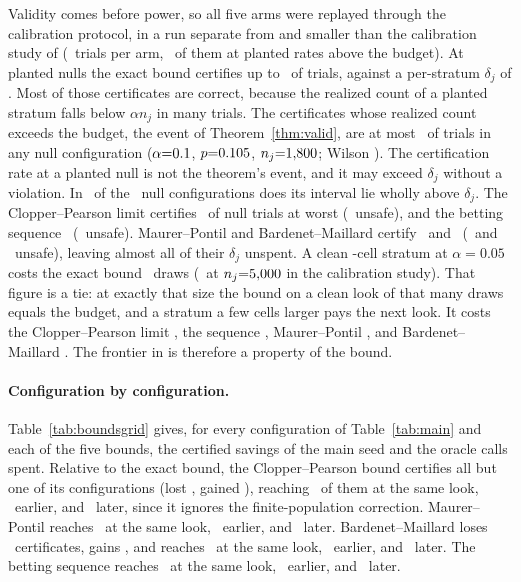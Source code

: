 Validity comes before power, so all five arms were replayed through
the calibration protocol, in a run separate from and smaller than the
calibration study of  (\boundCalTrials\ trials
per arm, \boundNullTrials\ of them at planted rates above the budget). At
planted nulls the exact bound certifies up to \boundExactNullWorst\ of
trials, against a per-stratum $\delta_j$ of \boundNullDeltaS. Most
of those certificates are correct, because the realized count of
a planted stratum falls below $\alpha n_j$ in many trials. The
certificates whose realized count exceeds the budget, the event of
Theorem~\ref{thm:valid}, are at most \boundExactNullUnsafe\ of trials
in any null configuration ($\alpha{=}0.1$,
$p{=}0.105$, $n_j{=}1{,}800$; Wilson
\boundExactNullUnsafeCi). The certification rate at a planted null is
not the theorem's event, and it may exceed $\delta_j$ without a
violation. In \boundExactNullsOver\ of the \boundNullConfigs\ null
configurations does its interval lie wholly above $\delta_j$. The Clopper--Pearson limit certifies \boundCpNullWorst\ of
null trials at worst (\boundCpNullUnsafe\ unsafe), and the betting
sequence \boundBetNullWorst\ (\boundBetNullUnsafe\ unsafe).
Maurer--Pontil and Bardenet--Maillard certify
\boundEbNullWorst\ and \boundWorNullWorst\ (\boundEbNullUnsafe\ and
\boundWorNullUnsafe\ unsafe), leaving almost all of their $\delta_j$
unspent. A clean \boundCleanStratum-cell stratum at
$\alpha{=}0.05$ costs the exact bound \boundExactCleanSample\ draws
(\minZeroFlipRealizedLarge\ at $n_j{=}5{,}000$
in the calibration study). That figure is a tie: at exactly that size
the bound on a clean look of that many draws equals the budget,
and a stratum a few cells larger pays the next look. It costs the Clopper--Pearson limit
\boundCpCleanSample, the sequence \boundBetCleanSample, Maurer--Pontil
\boundEbCleanSample, and Bardenet--Maillard \boundWorCleanSample.
The frontier in  is therefore a property
of the bound.

\keeprunin
\paragraph{Configuration by configuration.} Table~\ref{tab:boundsgrid} gives, for every configuration of
Table~\ref{tab:main} and each of the five bounds, the certified savings
of the main seed and the oracle calls spent. Relative to the exact
bound, the Clopper--Pearson bound certifies all but one of its
configurations (lost \boundCpLost, gained \boundCpExtra), reaching
\boundCpSameLook\ of them at the same look, \boundCpEarlier\ earlier,
and \boundCpLater\ later, since it ignores the finite-population
correction. Maurer--Pontil reaches \boundEbSameLook\ at the same look,
\boundEbEarlier\ earlier, and \boundEbLater\ later. Bardenet--Maillard
loses \boundWorLost\ certificates, gains \boundWorExtra, and reaches
\boundWorSameLook\ at the same look, \boundWorEarlier\ earlier, and
\boundWorLater\ later. The betting sequence reaches
\boundBetSameLook\ at the same look, \boundBetEarlier\ earlier, and
\boundBetLater\ later.
\par

